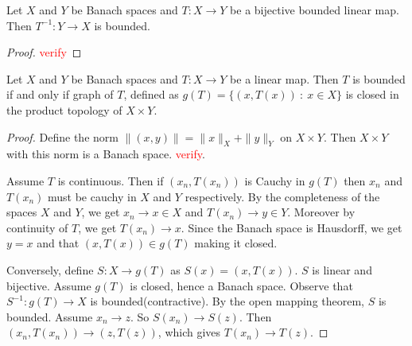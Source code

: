\begin{corollary}
  Let $X$ and $Y$ be Banach spaces and $T: X \to Y$ be a bijective bounded linear map. Then $T^{-1}: Y \to X$ is bounded.
\end{corollary}
\begin{proof}
  \textcolor{red}{verify}
\end{proof}

\begin{theorem}
  Let $X$ and $Y$ be Banach spaces and $T: X \to Y$ be a linear map. Then $T$ is bounded if and only if graph of $T$, defined as $g(T) = \{ (x, T(x)) \ : \ x \in X \}$ is closed in the product topology of $ X \times Y$.
\end{theorem}
\begin{proof}
  Define the norm $\|(x, y)\| = \|x\|_X + \|y\|_Y$ on $X \times Y$. Then $ X \times Y $ with this norm is a Banach space. \textcolor{red}{verify}.

  Assume $T$ is continuous. Then if $(x_n, T(x_n))$ is Cauchy in $g(T)$ then $x_n$ and $T(x_n)$ must be cauchy in $X$ and $Y$ respectively. By the completeness of the spaces $X$ and $Y$, we get $x_n \to x \in X$ and $T( x_n) \to y \in Y$. Moreover by continuity of $T$, we get $T(x_n) \to x$. Since the Banach space is Hausdorff, we get $y = x$ and that $(x, T(x)) \in g(T)$ making it closed.

  Conversely,  define $S: X \to g(T)$ as $S(x) = (x, T(x))$. $S$ is linear and bijective. Assume $ g(T)$ is closed, hence a Banach space. 
  Observe that $S^{-1}: g(T) \to X$ is bounded(contractive). By the open mapping theorem, $S$ is bounded. Assume $x_n \to z$. So $S(x_n) \to S(z)$. Then $(x_n, T(x_n)) \to (z, T(z))$, which gives $  T(x_n ) \to T(z)$.
\end{proof}
